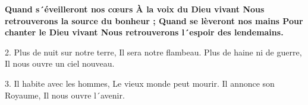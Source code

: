 \textbf{
Quand s´éveilleront nos cœurs
À la voix du Dieu vivant
Nous retrouverons la source du bonheur ;
Quand se lèveront nos mains
Pour chanter le Dieu vivant
Nous retrouverons l´espoir des lendemains.
}


2.
Plus de nuit sur notre terre,
Il sera notre flambeau.
Plus de haine ni de guerre,
Il nous ouvre un ciel nouveau.

3.
Il habite avec les hommes,
Le vieux monde peut mourir.
Il annonce son Royaume,
Il nous ouvre l´avenir. 

